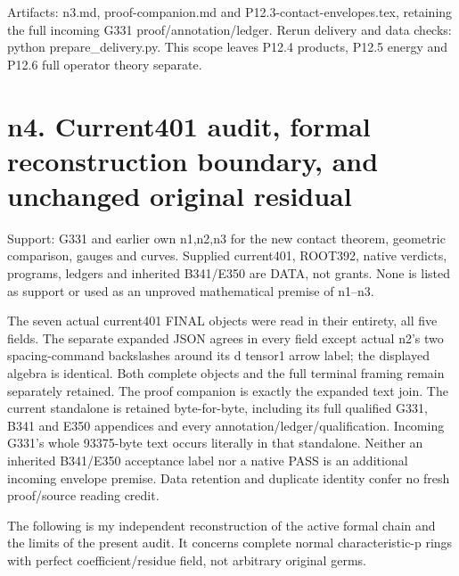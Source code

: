 \documentclass[11pt]{article}
\begin{document}
Artifacts: n3.md, proof-companion.md and P12.3-contact-envelopes.tex, retaining the full incoming G331 proof/annotation/ledger. Rerun delivery and data checks: python prepare\_delivery.py. This scope leaves P12.4 products, P12.5 energy and P12.6 full operator theory separate.


\section{n4. Current401 audit, formal reconstruction boundary, and unchanged original residual}

Support: G331 and earlier own n1,n2,n3 for the new contact theorem, geometric comparison, gauges and curves. Supplied current401, ROOT392, native verdicts, programs, ledgers and inherited B341/E350 are DATA, not grants. None is listed as support or used as an unproved mathematical premise of n1--n3.

The seven actual current401 FINAL objects were read in their entirety, all five fields. The separate expanded JSON agrees in every field except actual n2's two spacing-command backslashes around its d tensor1 arrow label; the displayed algebra is identical. Both complete objects and the full terminal framing remain separately retained. The proof companion is exactly the expanded text join. The current standalone is retained byte-for-byte, including its full qualified G331, B341 and E350 appendices and every annotation/ledger/qualification. Incoming G331's whole 93375-byte text occurs literally in that standalone. Neither an inherited B341/E350 acceptance label nor a native PASS is an additional incoming envelope premise. Data retention and duplicate identity confer no fresh proof/source reading credit.

The following is my independent reconstruction of the active formal chain and the limits of the present audit. It concerns complete normal characteristic-p rings with perfect coefficient/residue field, not arbitrary original germs.
\end{document}
